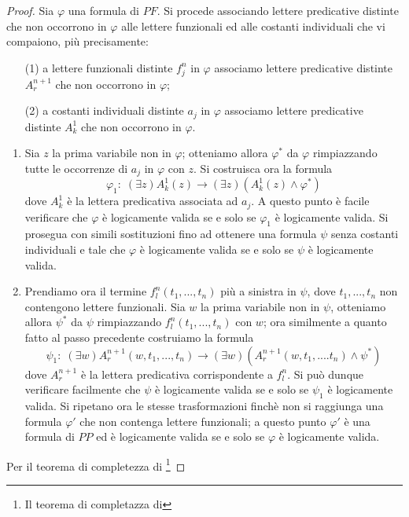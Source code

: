 \begin{proof}
Sia $\varphi$ una formula di $PF$. Si procede associando lettere predicative distinte
che non occorrono in $\varphi$ alle lettere funzionali ed alle costanti individuali 
che vi compaiono, più precisamente:
\begin{itemize}
 \item [(1)] a lettere funzionali distinte $f^n_j$ in $\varphi$ associamo lettere predicative
distinte $A^{n+1}_r$ che non occorrono in $\varphi$;
 \item [(2)] a costanti individuali distinte $a_j$ in $\varphi$ associamo lettere predicative
distinte $A^1_k$ che non occorrono in $\varphi$.
\end{itemize}
\begin{enumerate}
 \item Sia $z$ la prima variabile non in $\varphi$; otteniamo allora $\varphi^{\ast}$ da $\varphi$ rimpiazzando
tutte le occorrenze di $a_j$ in $\varphi$ con $z$. Si costruisca ora la formula
$$\varphi_1: \; (\exists z) A^1_k(z) \rightarrow (\exists z) (A^1_k(z)\wedge \varphi^{\ast}) $$
dove $A^1_k$ è la lettera predicativa associata ad $a_j$. \newline
A questo punto è facile verificare che $\varphi$ è logicamente valida se e solo se
$\varphi_1$ è logicamente valida. Si prosegua con simili sostituzioni fino ad 
ottenere una formula $\psi$ senza costanti individuali e tale che $\varphi$ è
logicamente valida se e solo se $\psi$ è logicamente valida.
\item Prendiamo ora il termine $f^n_l(t_1,...,t_n)$ più a sinistra in $\psi$, dove $t_1,...,t_n$
non contengono lettere funzionali. Sia $w$ la prima variabile non in $\psi$, otteniamo allora
 $\psi^{\ast}$ da $\psi$ rimpiazzando $f^n_l(t_1,...,t_n)$ con $w$; ora similmente a 
quanto fatto al passo precedente costruiamo la formula
$$\psi_1: \; (\exists w) A^{n+1}_r(w,t_1,...,t_n) \rightarrow (\exists w) (A^{n+1}_r(w,t_1,....t_n)\wedge \psi^{\ast})$$
dove $A^{n+1}_r$ è la lettera predicativa corrispondente a $f^n_l$. Si può dunque verificare facilmente che
$\psi$ è logicamente valida se e solo se $\psi_1$ è logicamente valida. Si ripetano ora
le stesse trasformazioni finchè non si raggiunga una formula $\varphi'$ che non contenga 
lettere funzionali; a questo punto $\varphi'$ è una formula di $PP$ ed è logicamente valida
se e solo se $\varphi$ è logicamente valida.
\end{enumerate}
Per il teorema di completezza di \godel\footnote{Il teorema di completazza di \godel
}
\end{proof}
